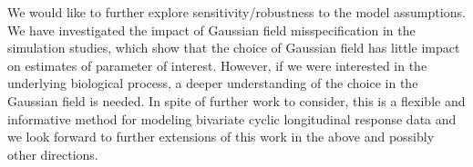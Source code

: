 \documentclass[article,lineno]{biometrika}
\def\Bka{{\it Biometrika}}
\begin{document}
We would like to further explore sensitivity/robustness to the model assumptions. We have investigated the impact of Gaussian field misspecification in the simulation studies, which show that the choice of Gaussian field has little impact on estimates of parameter of interest. However, if we were interested in the underlying biological process, a deeper understanding of the choice in the Gaussian field is needed. 
In spite of further work to consider, this is a flexible and informative method for modeling bivariate cyclic longitudinal response data and we look forward to further extensions of this work in the above and possibly other directions.

%
%


\appendix

%
%
\end{document}
